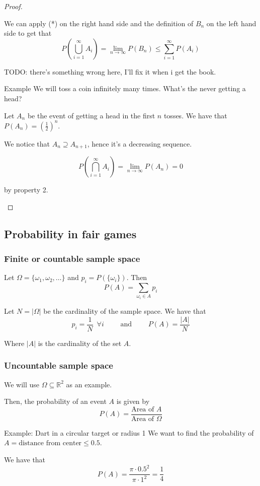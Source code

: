 \documentclass[10pt]{extarticle}
\newcommand{\R}{\mathbb{R}}
\begin{document}
\begin{proof}
\begin{enumerate}
              We can apply (*) on the right hand side and the definition of $B_n$ on the left hand side to get that
              $$
                  P\left(\bigcup_{i=1}^\infty A_i\right) = \lim_{n \to \infty} P(B_n) \le \sum_{i=1}^\infty P(A_i)
              $$

              TODO: there's something wrong here, I'll fix it when i get the book.
    \end{enumerate}

    \begin{examplebox}{Example}
        We will toss a coin infinitely many times. What's the never getting a head?

        Let $A_n$ be the event of getting a head in the first $n$ tosses.
        We have that $P(A_n) = \left(\frac{1}{2}\right)^n$.

        We notice that $A_n \supseteq A_{n+1}$, hence it's a decreasing sequence.

        $$
            P\left(\bigcap_{i=1}^\infty A_i\right) = \lim_{n \to \infty} P(A_n) = 0
        $$

        by property 2.

    \end{examplebox}
\end{proof}

\subsection{Probability in fair games}

\subsubsection{Finite or countable sample space}

Let $\Omega = \{\omega_1, \omega_2, \dots\}$ and $p_i = P(\{\omega_i\})$.
Then
$$
    P(A) = \sum_{\omega_i \in A} p_i
$$

Let $N = |\Omega|$ be the cardinality of the sample space.
We have that
$$
    p_i = \frac{1}{N} \enspace \forall i \qquad \text{ and } \qquad P(A) = \frac{|A|}{N}
$$

Where $|A|$ is the cardinality of the set $A$.

\subsubsection{Uncountable sample space}

We will use $\Omega \subseteq \R^2$ as an example.

Then, the probability of an event $A$ is given by
$$
    P(A) = \frac{\text{Area of } A}{\text{Area of } \Omega}
$$

\begin{examplebox}{Example: Dart in a circular target or radius 1}
    We want to find the probability of $A = \text{distance from center} \leq 0.5$.

    We have that
    $$
        P(A) = \frac{\pi \cdot 0.5^2}{\pi \cdot 1^2} = \frac{1}{4}
    $$
\end{examplebox}
\end{document}
